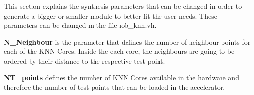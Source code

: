 This section explains the synthesis parameters that can be changed in
order to generate a bigger or smaller module to better fit the user needs.
These parameters can be changed in the file iob\_knn.vh.

\noindent \textbf{N\_Neighbour} is the parameter that defines the number of neighbour points for each of the KNN Cores. Inside the each core, the neighbours are going to be ordered by their distance to the respective test point.

\noindent \textbf{NT\_points} defines the number of KNN Cores available in the hardware and therefore the number of test points that can be loaded in the accelerator.
